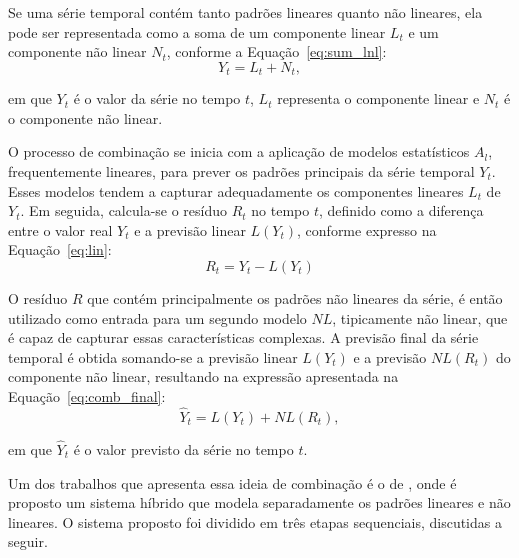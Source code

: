 Se uma série temporal contém tanto padrões lineares quanto não lineares, ela pode ser representada como a soma de um componente linear \( L_t \) e um componente não linear \( N_t \), conforme a Equação~\ref{eq:sum_lnl}:  
\begin{equation}
Y_t = L_t + N_t,    
\label{eq:sum_lnl}
\end{equation}

\noindent em que \( Y_t \) é o valor da série no tempo \( t \), \( L_t \) representa o componente linear e \( N_t \) é o componente não linear.

O processo de combinação se inicia com a aplicação de modelos estatísticos \( A_l \), frequentemente lineares, para prever os padrões principais da série temporal  \( Y_t \). Esses modelos tendem a capturar adequadamente os componentes lineares \( L_t \) de  \( Y_t \). Em seguida, calcula-se o resíduo \( R_t \) no tempo \( t \), definido como a diferença entre o valor real \( Y_t \) e a previsão linear \( L(Y_t) \), conforme expresso na Equação~\ref{eq:lin}:  
\begin{equation}
R_t = Y_t - L(Y_t)    
\label{eq:lin}
\end{equation}


O resíduo \( R \) que contém principalmente os padrões não lineares da série, é então utilizado como entrada para um segundo modelo \( NL \), tipicamente não linear, que é capaz de capturar essas características complexas. A previsão final da série temporal é obtida somando-se a previsão linear \( L(Y_t) \) e a previsão \( NL(R_t) \) do componente não linear, resultando na expressão apresentada na Equação~\ref{eq:comb_final}:  
\begin{equation}
\hat{Y}_t =  L(Y_t) +  NL(R_t),
\label{eq:comb_final}
\end{equation}

\noindent em que \( \hat{Y}_t \) é o valor previsto da série no tempo \( t \).


Um dos trabalhos que apresenta essa ideia de combinação é o de \cite{demattos2019}, onde é proposto um sistema híbrido que modela separadamente os padrões lineares e não lineares. O sistema proposto foi dividido em três etapas sequenciais, discutidas a seguir.

